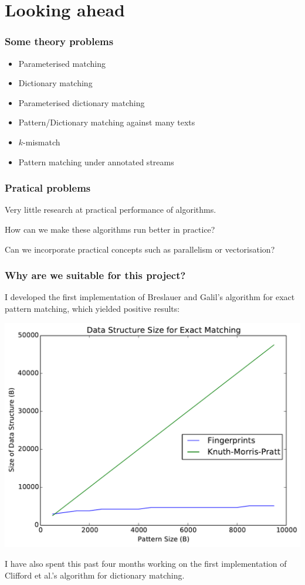 \documentclass{beamer}
\begin{document}
\section{Looking ahead}

\begin{frame}
\frametitle{Some theory problems}
\begin{itemize}
    \item Parameterised matching
    \item Dictionary matching
    \item Parameterised dictionary matching
    \item Pattern/Dictionary matching against many texts
    \item $k$-mismatch
    \item Pattern matching under annotated streams
\end{itemize}
\end{frame}


\begin{frame}
\frametitle{Pratical problems}
Very little research at practical performance of algorithms.

How can we make these algorithms run better in practice?

Can we incorporate practical concepts such as parallelism or vectorisation?
\end{frame}


\begin{frame}
\frametitle{Why are we suitable for this project?}
I developed the first implementation of Breslauer and Galil's algorithm for exact pattern matching, which yielded positive results:

\begin{center}
\includegraphics[width=0.5\paperwidth]{exact_size}
\end{center}

I have also spent this past four months working on the first implementation of Clifford et al.'s algorithm for dictionary matching.
\end{frame}
\end{document}
